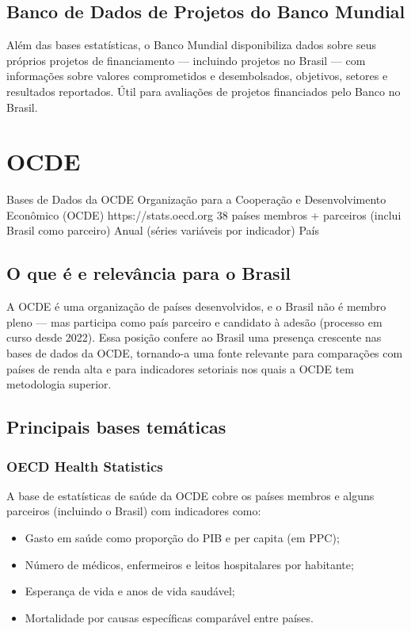 \subsection{Banco de Dados de Projetos do Banco Mundial}

Além das bases estatísticas, o Banco Mundial disponibiliza dados sobre seus próprios projetos de financiamento --- incluindo projetos no Brasil --- com informações sobre valores comprometidos e desembolsados, objetivos, setores e resultados reportados. Útil para avaliações de projetos financiados pelo Banco no Brasil.

\section{OCDE}

\ficharapida
  {Bases de Dados da OCDE}
  {Organização para a Cooperação e Desenvolvimento Econômico (OCDE)}
  {https://stats.oecd.org}
  {38 países membros + parceiros (inclui Brasil como parceiro)}
  {Anual (séries variáveis por indicador)}
  {País}

\subsection{O que é e relevância para o Brasil}

A OCDE é uma organização de países desenvolvidos, e o Brasil não é membro pleno --- mas participa como país parceiro e candidato à adesão (processo em curso desde 2022). Essa posição confere ao Brasil uma presença crescente nas bases de dados da OCDE, tornando-a uma fonte relevante para comparações com países de renda alta e para indicadores setoriais nos quais a OCDE tem metodologia superior.

\subsection{Principais bases temáticas}

\subsubsection{OECD Health Statistics}

A base de estatísticas de saúde da OCDE cobre os países membros e alguns parceiros (incluindo o Brasil) com indicadores como:
\begin{itemize}
  \item Gasto em saúde como proporção do PIB e per capita (em PPC);
  \item Número de médicos, enfermeiros e leitos hospitalares por habitante;
  \item Esperança de vida e anos de vida saudável;
  \item Mortalidade por causas específicas comparável entre países.
\end{itemize}

